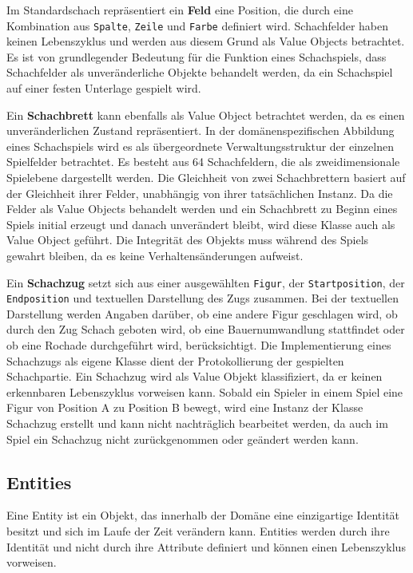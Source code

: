 Im Standardschach repräsentiert ein \textbf{Feld} eine Position, die durch eine Kombination aus \texttt{Spalte}, \texttt{Zeile} und \texttt{Farbe} definiert wird. 
Schachfelder haben keinen Lebenszyklus und werden aus diesem Grund als Value Objects betrachtet. 
Es ist von grundlegender Bedeutung für die Funktion eines Schachspiels, dass Schachfelder als unveränderliche Objekte behandelt werden, da ein Schachspiel auf einer \glqq festen Unterlage\grqq{} gespielt wird. 

Ein \textbf{Schachbrett} kann ebenfalls als Value Object betrachtet werden, da es einen unveränderlichen Zustand repräsentiert. 
In der domänenspezifischen Abbildung eines Schachspiels wird es als übergeordnete Verwaltungsstruktur der einzelnen Spielfelder betrachtet. 
Es besteht aus 64 Schachfeldern, die als zweidimensionale Spielebene dargestellt werden.
Die Gleichheit von zwei Schachbrettern basiert auf der Gleichheit ihrer Felder, unabhängig von ihrer tatsächlichen Instanz. 
Da die Felder als Value Objects behandelt werden und ein Schachbrett zu Beginn eines Spiels initial erzeugt und danach unverändert bleibt, wird diese Klasse auch als Value Object geführt. 
Die Integrität des Objekts muss während des Spiels gewahrt bleiben, da es keine Verhaltensänderungen aufweist. 

Ein \textbf{Schachzug} setzt sich aus einer ausgewählten \texttt{Figur}, der \texttt{Startposition}, der \texttt{Endposition} und textuellen Darstellung des Zugs zusammen.
Bei der textuellen Darstellung werden Angaben darüber, ob eine andere Figur geschlagen wird, ob durch den Zug Schach geboten wird, ob eine Bauernumwandlung stattfindet oder ob eine Rochade durchgeführt wird, berücksichtigt. 
Die Implementierung eines Schachzugs als eigene Klasse dient der Protokollierung der gespielten Schachpartie. 
Ein Schachzug wird als Value Objekt klassifiziert, da er keinen erkennbaren Lebenszyklus vorweisen kann. 
Sobald ein Spieler in einem Spiel eine Figur von Position A zu Position B bewegt, wird eine Instanz der Klasse Schachzug erstellt und kann nicht nachträglich bearbeitet werden, da auch im Spiel ein Schachzug nicht zurückgenommen oder geändert werden kann. 

\subsection{Entities}

Eine Entity ist ein Objekt, das innerhalb der Domäne eine einzigartige Identität besitzt und sich im Laufe der Zeit verändern kann. 
Entities werden durch ihre Identität und nicht durch ihre Attribute definiert und können einen Lebenszyklus vorweisen. 

